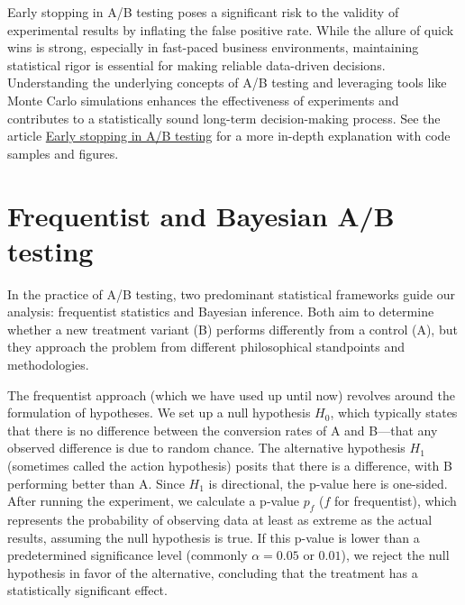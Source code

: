 \documentclass[final,5p,times,twocolumn,authoryear]{elsarticle}
\begin{document}

Early stopping in A/B testing poses a significant risk to the validity of experimental results by inflating the false positive rate. While the allure of quick wins is strong, especially in fast-paced business environments, maintaining statistical rigor is essential for making reliable data-driven decisions. Understanding the underlying concepts of A/B testing and leveraging tools like Monte Carlo simulations enhances the effectiveness of experiments and contributes to a statistically sound long-term decision-making process. See the article \href{https://bytepawn.com/early-stopping-in-ab-testing.html}{Early stopping in A/B testing} for a more in-depth explanation with code samples and figures.

\section{Frequentist and Bayesian A/B testing}

In the practice of A/B testing, two predominant statistical frameworks guide our analysis: frequentist statistics and Bayesian inference. Both aim to determine whether a new treatment variant (B) performs differently from a control (A), but they approach the problem from different philosophical standpoints and methodologies.

The frequentist approach (which we have used up until now) revolves around the formulation of hypotheses. We set up a null hypothesis $ H_0 $, which typically states that there is no difference between the conversion rates of A and B—that any observed difference is due to random chance. The alternative hypothesis $ H_1 $ (sometimes called the action hypothesis) posits that there is a difference, with B performing better than A. Since $ H_1 $ is directional, the p-value here is one-sided. After running the experiment, we calculate a p-value $ p_f $ ($f$ for frequentist), which represents the probability of observing data at least as extreme as the actual results, assuming the null hypothesis is true. If this p-value is lower than a predetermined significance level (commonly $ \alpha = 0.05 $ or $ 0.01 $), we reject the null hypothesis in favor of the alternative, concluding that the treatment has a statistically significant effect.
\end{document}
